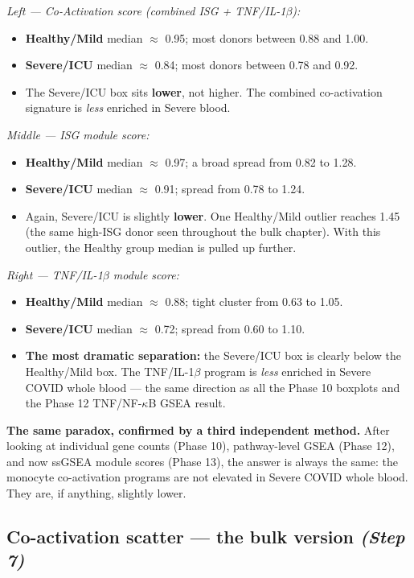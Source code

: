 \documentclass[11pt, a4paper]{article}
\begin{document}
\textit{Left — Co-Activation score (combined ISG + TNF/IL-1$\beta$):}
\begin{itemize}[nosep]
  \item \textbf{Healthy/Mild} median $\approx$ 0.95; most donors between 0.88 and 1.00.
  \item \textbf{Severe/ICU} median $\approx$ 0.84; most donors between 0.78 and 0.92.
  \item The Severe/ICU box sits \textbf{lower}, not higher.
        The combined co-activation signature is \textit{less} enriched in Severe blood.
\end{itemize}

\textit{Middle — ISG module score:}
\begin{itemize}[nosep]
  \item \textbf{Healthy/Mild} median $\approx$ 0.97; a broad spread from 0.82 to 1.28.
  \item \textbf{Severe/ICU} median $\approx$ 0.91; spread from 0.78 to 1.24.
  \item Again, Severe/ICU is slightly \textbf{lower}. One Healthy/Mild outlier reaches
        1.45 (the same high-ISG donor seen throughout the bulk chapter). With this
        outlier, the Healthy group median is pulled up further.
\end{itemize}

\textit{Right — TNF/IL-1$\beta$ module score:}
\begin{itemize}[nosep]
  \item \textbf{Healthy/Mild} median $\approx$ 0.88; tight cluster from 0.63 to 1.05.
  \item \textbf{Severe/ICU} median $\approx$ 0.72; spread from 0.60 to 1.10.
  \item \textbf{The most dramatic separation:} the Severe/ICU box is clearly below
        the Healthy/Mild box. The TNF/IL-1$\beta$ program is \textit{less} enriched
        in Severe COVID whole blood — the same direction as all the Phase 10 boxplots
        and the Phase 12 TNF/NF-$\kappa$B GSEA result.
\end{itemize}

\textbf{The same paradox, confirmed by a third independent method.}
After looking at individual gene counts (Phase 10), pathway-level GSEA (Phase 12),
and now ssGSEA module scores (Phase 13), the answer is always the same:
the monocyte co-activation programs are not elevated in Severe COVID whole blood.
They are, if anything, slightly lower.

\subsection{Co-activation scatter — the bulk version \small\normalfont\textit{(Step 7)}}
\end{document}
